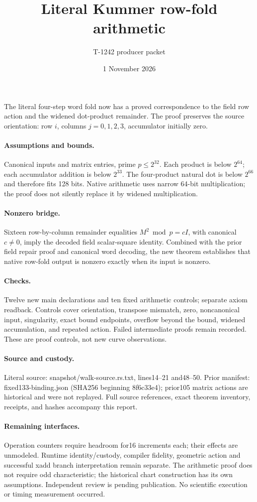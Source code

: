 \documentclass[11pt]{article}
\begin{document}
\title{Literal Kummer row-fold arithmetic}
\author{T-1242 producer packet}
\date{1 November 2026}\maketitle
The literal four-step word fold now has a proved correspondence to the field row action and the widened dot-product remainder. The proof preserves the source orientation: row $i$, columns $j=0,1,2,3$, accumulator initially zero.

\paragraph{Assumptions and bounds.} Canonical inputs and matrix entries, prime $p\leq2^{32}$. Each product is below $2^{64}$; each accumulator addition is below $2^{33}$. The four-product natural dot is below $2^{66}$ and therefore fits 128 bits. Native arithmetic uses narrow 64-bit multiplication; the proof does not silently replace it by widened multiplication.

\paragraph{Nonzero bridge.} Sixteen row-by-column remainder equalities $M^2\bmod p=cI$, with canonical $c\ne0$, imply the decoded field scalar-square identity. Combined with the prior field repair proof and canonical word decoding, the new theorem establishes that native row-fold output is nonzero exactly when its input is nonzero.

\paragraph{Checks.} Twelve new main declarations and ten fixed arithmetic controls; separate axiom readback. Controls cover orientation, transpose mismatch, zero, noncanonical input, singularity, exact bound endpoints, overflow beyond the bound, widened accumulation, and repeated action. Failed intermediate proofs remain recorded. These are proof controls, not new curve observations.

\paragraph{Source and custody.} Literal source: snapshot/walk-source.rs.txt, lines14--21 and48--50. Prior manifest: fixed133-binding.json (SHA256 beginning 8f6c33e4); prior105 matrix actions are historical and were not replayed. Full source references, exact theorem inventory, receipts, and hashes accompany this report.

\paragraph{Remaining interfaces.} Operation counters require headroom for16 increments each; their effects are unmodeled. Runtime identity/custody, compiler fidelity, geometric action and successful xadd branch interpretation remain separate. The arithmetic proof does not require odd characteristic; the historical chart construction has its own assumptions. Independent review is pending publication. No scientific execution or timing measurement occurred.
\end{document}
